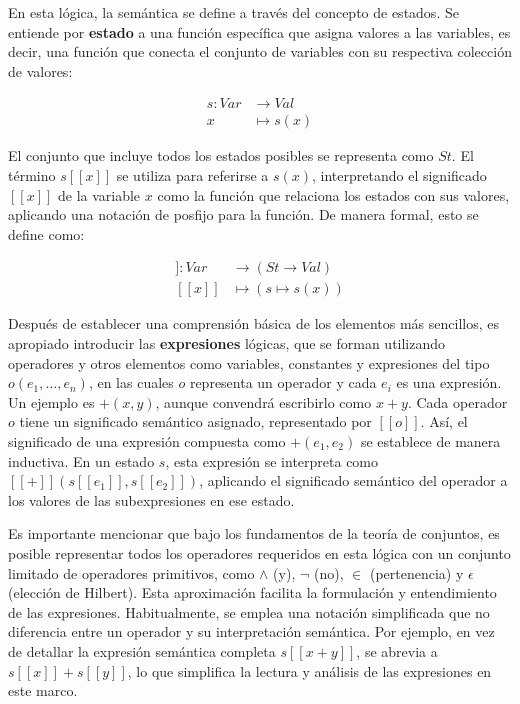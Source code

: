 En esta lógica, la semántica se define a través del concepto de estados. Se entiende por \textbf{estado} a una función específica que asigna valores a las variables, es decir, una función que conecta el conjunto de variables con su respectiva colección de valores:

\begin{align*}
s : Var &\to Val \\
x &\mapsto s(x)
\end{align*}

El conjunto que incluye todos los estados posibles se representa como $St$. El término $s[[x]]$ se utiliza para referirse a $s(x)$, interpretando el significado $[[x]]$ de la variable $x$ como la función que relaciona los estados con sus valores, aplicando una notación de posfijo para la función. De manera formal, esto se define como:

\begin{align*}
[[\cdot]] : Var &\to (St \to Val) \\
[[x]] &\mapsto (s \mapsto s(x))
\end{align*}

Después de establecer una comprensión básica de los elementos más sencillos, es apropiado introducir las \textbf{expresiones} lógicas, que se forman utilizando operadores y otros elementos como variables, constantes y expresiones del tipo $o(e_1,\ldots,e_n)$, en las cuales $o$ representa un operador y cada $e_i$ es una expresión. Un ejemplo es $+(x,y)$, aunque convendrá escribirlo como $x+y$. Cada operador $o$ tiene un significado semántico asignado, representado por $[[o]]$. Así, el significado de una expresión compuesta como $+(e_1,e_2)$ se establece de manera inductiva. En un estado $s$, esta expresión se interpreta como $[[+]](s[[e_1]],s[[e_2]])$, aplicando el significado semántico del operador a los valores de las subexpresiones en ese estado.

Es importante mencionar que bajo los fundamentos de la teoría de conjuntos, es posible representar todos los operadores requeridos en esta lógica con un conjunto limitado de operadores primitivos, como $\land$ (y), $\neg$ (no), $\in$ (pertenencia) y $\epsilon$ (elección de Hilbert). Esta aproximación facilita la formulación y entendimiento de las expresiones. Habitualmente, se emplea una notación simplificada que no diferencia entre un operador y su interpretación semántica. Por ejemplo, en vez de detallar la expresión semántica completa $s[[x+y]]$, se abrevia a $s[[x]] + s[[y]]$, lo que simplifica la lectura y análisis de las expresiones en este marco.

